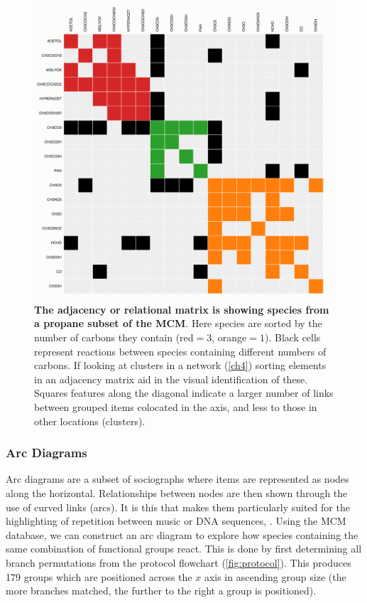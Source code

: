 \begin{figure}[H]
     \centering
     \includegraphics[width=.7\textwidth]{adjmatrix.png}

      \caption{\textbf{The adjacency or relational matrix is showing species from a propane subset of the MCM}. Here species are sorted by the number of carbons they contain (red$=3$, orange$=1$). Black cells represent reactions between species containing different numbers of carbons. If looking at clusters in a network (\autoref{ch4}) sorting elements in an adjacency matrix aid in the visual identification of these. Squares features along the diagonal indicate a larger number of links between grouped items colocated in the axis, and less to those in other locations (clusters).}
        \label{fig:adj}
\end{figure}

\subsubsection{Arc Diagrams}
Arc diagrams are a subset of sociographs where items are represented as nodes along the horizontal. Relationships between nodes are then shown through the use of curved links (arcs). It is this that makes them particularly suited for the highlighting of repetition between music or DNA sequences, \citep{arc}. Using the MCM database, we can construct an arc diagram to explore how species containing the same combination of functional groups react. This is done by first determining all branch permutations from the protocol flowchart (\autoref{fig:protocol}). This produces 179 groups which are positioned across the $x$ axis in ascending group size (the more branches matched, the further to the right a group is positioned).

